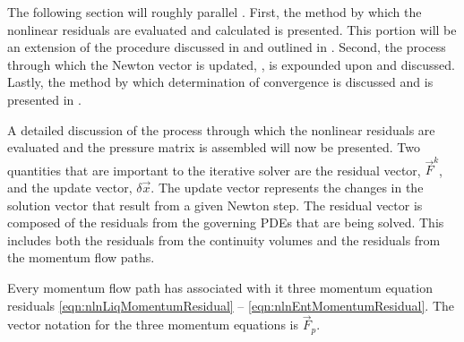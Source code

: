 The following section will roughly parallel .
First, the method by which the nonlinear residuals are evaluated and calculated is presented.
This portion will be an extension of the procedure discussed in  and outlined in .
Second, the process through which the Newton vector is updated, , is expounded upon and  discussed.
Lastly, the method by which determination of convergence is discussed and is presented in .

A detailed discussion of the process through which the nonlinear residuals are evaluated and the pressure matrix is assembled will now be presented.
Two quantities that are important to the iterative solver are the residual vector, $\vec{F}^{k}$, and the update vector, $\delta \vec{x}$.
The update vector represents the changes in the solution vector that result from a given Newton step.
The residual vector is composed of the residuals from the governing PDEs that are being solved.
This includes both the residuals from the continuity volumes and the residuals from the momentum flow paths.

Every momentum flow path has associated with it three momentum equation residuals \eqref{eqn:nlnLiqMomentumResidual} -- \eqref{eqn:nlnEntMomentumResidual}.
The vector notation for the three momentum equations is $\vec{F}_{p}$.

